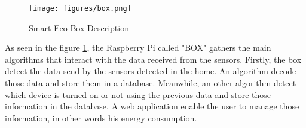 \begin{figure}[H]
\centering
\texttt{[image: figures/box.png]}
\caption{Smart Eco Box Description}
\label{fig:boxDescription}
\end{figure}

As seen in the figure \ref{fig:boxDescription}, the Raspberry Pi called "BOX" gathers the main algorithms that interact with the data received from the sensors. Firstly, the box detect the data send by the sensors detected in the home. An algorithm decode those data and store them in a database. Meanwhile, an other algorithm detect which device is turned on or not using the previous data and store those information in the database. A web application enable the user to manage those information, in other words his energy consumption.

